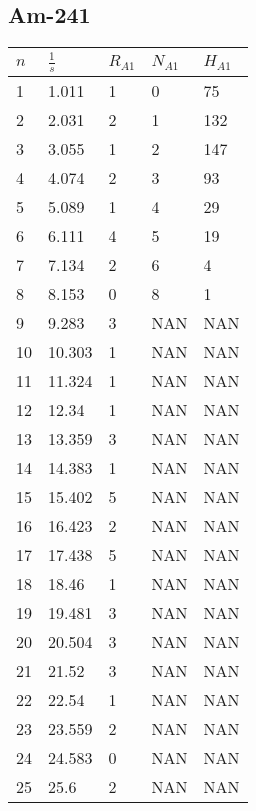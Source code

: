 \documentclass{article}
\begin{document}
			\subsection*{Am-241}
				\begin{longtable}{@{}lllll@{}}
					\toprule
					$n$   & $\frac{1}{s}$     & $R_{A1}$ & $N_{A1}$ & $H_{A1}$ \\* \midrule
					\endfirsthead
					\endhead
					\bottomrule
					\endfoot
					\endlastfoot
					1   & 1.011   & 1     & 0     & 75    \\
					2   & 2.031   & 2     & 1     & 132   \\
					3   & 3.055   & 1     & 2     & 147   \\
					4   & 4.074   & 2     & 3     & 93    \\
					5   & 5.089   & 1     & 4     & 29    \\
					6   & 6.111   & 4     & 5     & 19    \\
					7   & 7.134   & 2     & 6     & 4     \\
					8   & 8.153   & 0     & 8     & 1     \\
					9   & 9.283   & 3     & NAN   & NAN   \\
					10  & 10.303  & 1     & NAN   & NAN   \\
					11  & 11.324  & 1     & NAN   & NAN   \\
					12  & 12.34   & 1     & NAN   & NAN   \\
					13  & 13.359  & 3     & NAN   & NAN   \\
					14  & 14.383  & 1     & NAN   & NAN   \\
					15  & 15.402  & 5     & NAN   & NAN   \\
					16  & 16.423  & 2     & NAN   & NAN   \\
					17  & 17.438  & 5     & NAN   & NAN   \\
					18  & 18.46   & 1     & NAN   & NAN   \\
					19  & 19.481  & 3     & NAN   & NAN   \\
					20  & 20.504  & 3     & NAN   & NAN   \\
					21  & 21.52   & 3     & NAN   & NAN   \\
					22  & 22.54   & 1     & NAN   & NAN   \\
					23  & 23.559  & 2     & NAN   & NAN   \\
					24  & 24.583  & 0     & NAN   & NAN   \\
					25  & 25.6    & 2     & NAN   & NAN   \\

\end{longtable}
\end{document}
